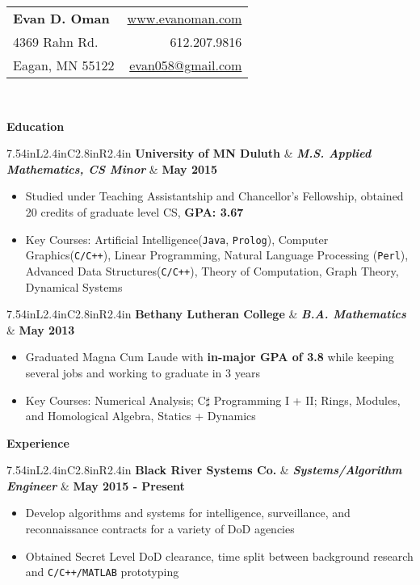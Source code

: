 \documentclass[letterpaper,10pt]{article}
\newcommand{\resitem}[1]{\item #1 

\vspace{-.1in}
}
\newcommand{\resheading}[1]{
	{
		\large\colorbox{mygrey}
		{
			\begin{minipage}{.98\textwidth}

			\centerline{\textbf{#1 \vphantom{p\^{E}}}}
\end{minipage}
}}
}
\newcommand{\rressubheading}[3]{
\begin{tabular*}{7.54in}{L{2.4in}C{2.8in}R{2.4in}}
		\textbf{#1} & \textit{\textbf{#2}}  & \textbf{#3}
\end{tabular*}}
\begin{document}
\begin{tabular*}{7.6in}{l@{\extracolsep{\fill}}r}
\textbf{\Large Evan D. Oman}  &  \href{http://www.evanoman.com}{www.evanoman.com} \\
4369 Rahn Rd. & 612.207.9816\\
Eagan, MN 55122& \href{mailto:evan058@gmail.com}{evan058@gmail.com}\\
\end{tabular*}
\\

\vspace{0.1in}

\resheading{Education}
\rressubheading{University of MN Duluth}{M.S. Applied Mathematics, CS Minor}{May 2015}
\vspace{-.1in}
\begin{itemize}
	\resitem{Studied under Teaching Assistantship and Chancellor's Fellowship, obtained 20 credits of graduate level CS, \textbf{GPA: 3.67}}
	\item Key Courses: Artificial Intelligence(\verb!Java!, \verb!Prolog!), Computer Graphics(\verb!C/C++!), Linear Programming, Natural Language Processing (\verb!Perl!), Advanced Data Structures(\verb!C/C++!), Theory of Computation, Graph Theory, Dynamical Systems
\end{itemize}
\rressubheading{Bethany Lutheran College}{B.A. Mathematics}{May 2013}
\vspace{-.1in}
\begin{itemize}
	\resitem{Graduated Magna Cum Laude with \textbf{in-major GPA of 3.8} while keeping several jobs and working to graduate in 3 years}
	\resitem{Key Courses: Numerical Analysis; C$\sharp$ Programming I + II; Rings, Modules, and Homological Algebra, Statics + Dynamics}
\end{itemize}
\vspace{.1in}

\resheading{Experience}
\rressubheading{Black River Systems Co.}{Systems/Algorithm Engineer}{May 2015 - Present}
\vspace{-.1in}
\begin{itemize}
	\resitem{Develop algorithms and systems for intelligence, surveillance, and reconnaissance contracts for a variety of DoD agencies}
	\item Obtained Secret Level DoD clearance, time split between background research and \verb!C/C++/MATLAB! prototyping
\end{itemize}
\end{document}
